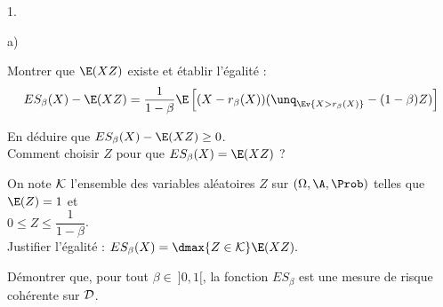 \documentclass[11pt]{article}%
\begin{document}
\begin{noliste}{1.}
\begin{noliste}{a)}
    

    
    \item Montrer que $\E(XZ)$ existe et établir l'égalité :
    \[
    ES_\beta(X) -\E(XZ) = \dfrac{1}{1-\beta} \E\left[(X-r_\beta(X))
      (\unq_{\Ev{X > r_\beta(X)}}-(1-\beta)Z)\right]
    \]
    
    
    
    
    
    
    \item En déduire que $ES_\beta(X)-\E(XZ) \geq 0$.\\
    Comment choisir $Z$ pour que $ES_\beta(X)=\E(XZ)$ ?
    
    
  \end{noliste}
  
  
  
  
  

  \item On note ${\cal K}$ l'ensemble des variables aléatoires $Z$ 
  sur $(\Omega,\A,\Prob)$ telles que $\E(Z)=1$ et \\
  $0\leq Z \leq \dfrac{1}{1-\beta}$.\\[.1cm]
  Justifier l'égalité : $ES_\beta(X)= \dmax{Z \in {\cal K}} 
  \E(XZ).$
  
  
  
  
  \item Démontrer que, pour tout $\beta \in \ ]0,1[$, la fonction 
  $ES_\beta$ est une mesure de risque cohérente sur ${\cal D}$.
  
  
\end{noliste}
\end{document}
